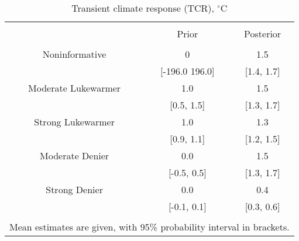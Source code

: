 
\begin{table}[!htbp] \centering 
  \caption{Transient climate response (TCR), $^\circ$C} 
  \label{tab:tcr-all} 
\begin{tabular}{@{\extracolsep{5pt}} ccc} 
\\[-1.8ex]\hline 
\hline \\[-1.8ex] 
 & Prior & Posterior \\ 
\hline \\[-1.8ex] 
Noninformative & 0 & 1.5 \\ 
 & [-196.0  196.0] & [1.4, 1.7] \\ 
Moderate Lukewarmer & 1.0 & 1.5 \\ 
 & [0.5, 1.5] & [1.3, 1.7] \\ 
Strong Lukewarmer & 1.0 & 1.3 \\ 
 & [0.9, 1.1] & [1.2, 1.5] \\ 
Moderate Denier & 0.0 & 1.5 \\ 
 & [-0.5, 0.5] & [1.3, 1.7] \\ 
Strong Denier & 0.0 & 0.4 \\ 
 & [-0.1, 0.1] & [0.3, 0.6] \\ 
\hline \\[-1.8ex] 
\multicolumn{3}{l}{\footnotesize Mean estimates are given, with 95\% probability interval in brackets.} \\ 
\end{tabular} 
\end{table} 
